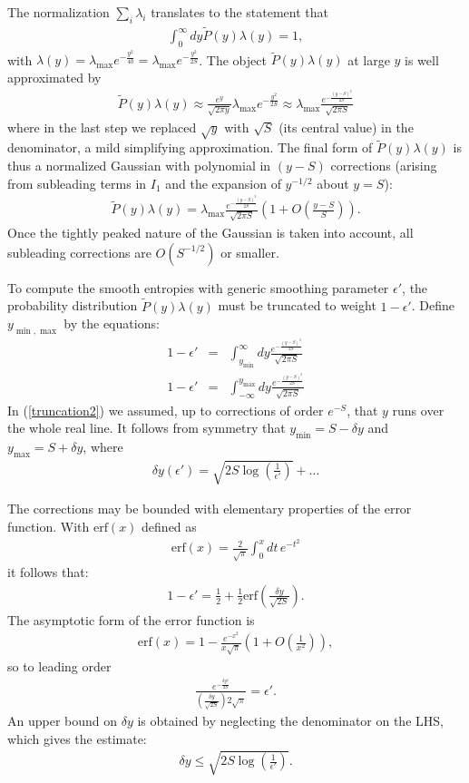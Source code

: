 \documentclass[12pt]{article}
\newcommand{\beq}{\begin{eqnarray}}
\newcommand{\eeq}{\end{eqnarray}}
\newcommand{\lamm}{\lambda_{\max}}
\begin{document}
The normalization $\sum_i \lambda_i$ translates to the statement that
\beq
\int_0^\infty dy \tilde{P}(y) \lambda(y) = 1,
\eeq
with $\lambda(y) = \lamm e^{-\frac{y^2}{4b}} = \lamm e^{-\frac{y^2}{2S}}$. The object $\tilde{P}(y) \lambda(y)$ at large $y$ is well approximated by
\beq
\tilde{P}(y) \lambda(y) \approx \frac{e^y}{\sqrt{2 \pi y}} \lamm e^{- \frac{y^2}{2S}} \approx \lamm \frac{e^{- \frac{(y-S)^2}{2S}}}{\sqrt{2 \pi S}}
\eeq
where in the last step we replaced $\sqrt{y}$ with $\sqrt{S}$ (its central value) in the denominator, a mild simplifying approximation. The final form of $\tilde{P}(y) \lambda(y)$ is thus a normalized Gaussian with polynomial in $(y-S)$ corrections (arising from subleading terms in $I_1$ and the expansion of $y^{-1/2}$ about $y=S$):
\beq
\tilde{P}(y)\lambda(y) = \lamm \frac{e^{- \frac{(y-S)^2}{2S}}}{\sqrt{2 \pi S}}\left(1 + O\left(\frac{y-S}{S}\right)\right).
\eeq
Once the tightly peaked nature of the Gaussian is taken into account, all subleading corrections are $O(S^{-1/2})$ or smaller.

To compute the smooth entropies with generic smoothing parameter $\epsilon'$, the probability distribution $\tilde{P}(y)\lambda(y)$ must be truncated to weight $1-\epsilon'$. Define $y_{\min,\max}$ by the equations:
\begin{eqnarray}
1-\epsilon' & = & \int_{y_{\min}}^\infty dy \frac{e^{-\frac{(y-S)^2}{2S}}}{\sqrt{2 \pi S}}\\
1-\epsilon' & = & \int_{-\infty}^{y_{\max}} dy \frac{e^{-\frac{(y-S)^2}{2S}}}{\sqrt{2 \pi S}}
\label{truncation2}
\end{eqnarray}
In (\ref{truncation2}) we assumed, up to corrections of order $e^{-S}$, that $y$ runs over the whole real line. It follows from symmetry that $y_{\min} = S - \delta y$ and $y_{\max} = S + \delta y$, where
\beq
\delta y(\epsilon') = \sqrt{2 S \log\left(\frac{1}{\epsilon'}\right)}+...
\eeq

The corrections may be bounded with elementary properties of the error function. With $\text{erf}(x)$ defined as
\beq
\text{erf}(x) = \frac{2}{\sqrt{\pi}}\int_0^x dt\, e^{-t^2}
\eeq
it follows that:
\beq
1-\epsilon' = \frac{1}{2} + \frac{1}{2}\text{erf}\left(\frac{\delta y}{\sqrt{2S}}\right).
\eeq
The asymptotic form of the error function is
\beq
\text{erf}(x) = 1 - \frac{e^{-x^2}}{x\sqrt{\pi}}\left(1 + O\left(\frac{1}{x^2}\right)\right),
\eeq
so to leading order
\beq
\frac{e^{-\frac{\delta y^2}{2S}}}{ \left(\frac{\delta y}{\sqrt{2S}}\right) 2\sqrt{\pi}} = \epsilon'.
\eeq
An upper bound on $\delta y$ is obtained by neglecting the denominator on the LHS, which gives the estimate:
\beq
\delta y \leq \sqrt{2 S \log\left(\frac{1}{\epsilon'}\right)}.
\eeq
\end{document}

